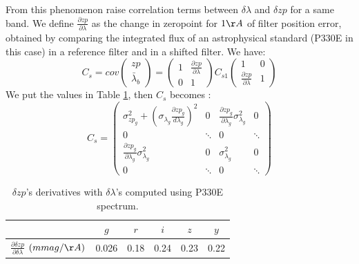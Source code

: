 \documentclass[\docopts]{\docclass}
\begin{document}
From this phenomenon raise correlation terms between $\delta \lambda$ and $\delta zp$ for a same band.
We define $\frac{\partial zp}{\partial \lambda}$ as the change in zeropoint for $1 \AA$ of filter position error, obtained by comparing the integrated flux of an astrophysical standard (P330E in this case) in a reference filter and in a shifted filter.
We have:
\begin{equation}
C_s = cov
\begin{pmatrix}
  zp \\
  \bar\lambda_b 
\end{pmatrix}
=
\begin{pmatrix}
  1 & \frac{\partial zp}{\partial \lambda} \\
  0 & 1
\end{pmatrix}
C_{s1}
\begin{pmatrix}
  1 & 0 \\
  \frac{\partial zp}{\partial \lambda} & 1
\end{pmatrix}
\end{equation}
We put the values in Table \ref{tab::calib_derivatives}, then $C_s$ becomes :
\begin{equation}
\label{eq::cov_calib}
C_s = 
\begin{pmatrix}
  \sigma^2_{ zp_{g}} + (\sigma_{\lambda_g} \frac{\partial zp_g}{d\lambda_g})^2 & 0 & \frac{\partial zp_g}{\partial \lambda_g} \sigma^2_{ \lambda_g} & 0 \\
   0 & \ddots & 0 & \ddots \\
   \frac{\partial zp_g}{\partial \lambda_g} \sigma^2_{ \lambda_g} & 0 & \sigma^2_{\lambda_{g}} & 0 \\
   0 & \ddots & 0 & \ddots 
\end{pmatrix}
\end{equation}

\begin{table}[t]
\begin{center}
\caption{$\delta zp$'s derivatives with $\delta\lambda$'s computed using P330E spectrum.}
\label{tab::calib_derivatives}
\begin{tabular}{l|ccccc}
\hline
\hline
  & $g$ & $r$ & $i$ & $z$ & $y$ \\
\hline 
  $\frac{\partial\delta zp}{\partial\delta \lambda}$ $(mmag/\AA)$& 0.026 & 0.18 & 0.24 & 0.23 & 0.22\\
\hline
\end{tabular}
\end{center}
\end{table}
\end{document}
